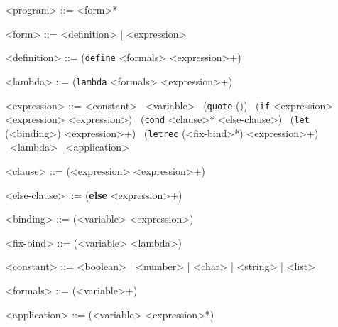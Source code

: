 \setlength{\grammarparsep}{8pt} %
\setlength{\grammarindent}{8em} %
\begin{grammar}
    <program>     ::= <form>*

    <form>        ::= <definition> | <expression>

    <definition>  ::= (\texttt{define} <formals> <expression>+)

    <lambda>      ::= (\texttt{lambda} <formals> <expression>+)

    <expression>  ::= <constant>
    \indalt\ <variable>
    \indalt\ (\texttt{quote} ())
    \indalt\ (\texttt{if} <expression> <expression> <expression>)
    \indalt\ (\texttt{cond} <clause>* <else-clause>)
    \indalt\ (\texttt{let} (<binding>) <expression>+)
    \indalt\ (\texttt{letrec} (<fix-bind>*) <expression>+)
    \indalt\ <lambda>
    \indalt\ <application>

    <clause> ::= (<expression> <expression>+)

    <else-clause> ::= (\textbf{else} <expression>+)

    <binding> ::= (<variable> <expression>)

    <fix-bind> ::= (<variable> <lambda>)

    <constant>    ::= <boolean> | <number> | <char> | <string> | <list>

    <formals>     ::= (<variable>+)

    <application> ::= (<variable> <expression>*)
\end{grammar}
